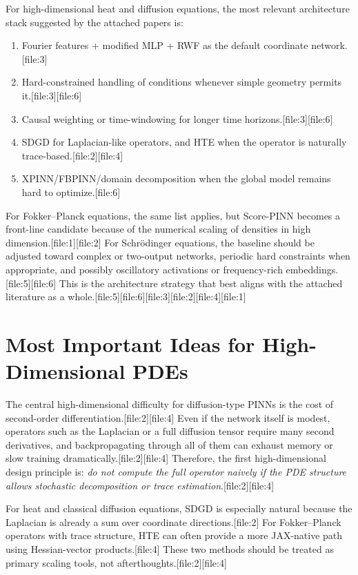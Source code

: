 \documentclass[11pt]{report}
\begin{document}
For high-dimensional heat and diffusion equations, the most relevant architecture stack suggested by the attached papers is:
\begin{enumerate}[label=\arabic*.]
\item Fourier features + modified MLP + RWF as the default coordinate network.[file:3]
\item Hard-constrained handling of conditions whenever simple geometry permits it.[file:3][file:6]
\item Causal weighting or time-windowing for longer time horizons.[file:3][file:6]
\item SDGD for Laplacian-like operators, and HTE when the operator is naturally trace-based.[file:2][file:4]
\item XPINN/FBPINN/domain decomposition when the global model remains hard to optimize.[file:6]
\end{enumerate}

For Fokker--Planck equations, the same list applies, but Score-PINN becomes a front-line candidate because of the numerical scaling of densities in high dimension.[file:1][file:2]  
For Schr\"odinger equations, the baseline should be adjusted toward complex or two-output networks, periodic hard constraints when appropriate, and possibly oscillatory activations or frequency-rich embeddings.[file:5][file:6]  
This is the architecture strategy that best aligns with the attached literature as a whole.[file:5][file:6][file:3][file:2][file:4][file:1]

\chapter{Most Important Ideas for High-Dimensional PDEs}

The central high-dimensional difficulty for diffusion-type PINNs is the cost of second-order differentiation.[file:2][file:4]  
Even if the network itself is modest, operators such as the Laplacian or a full diffusion tensor require many second derivatives, and backpropagating through all of them can exhaust memory or slow training dramatically.[file:2][file:4]  
Therefore, the first high-dimensional design principle is: \emph{do not compute the full operator naively if the PDE structure allows stochastic decomposition or trace estimation}.[file:2][file:4]

For heat and classical diffusion equations, SDGD is especially natural because the Laplacian is already a sum over coordinate directions.[file:2]  
For Fokker--Planck operators with trace structure, HTE can often provide a more JAX-native path using Hessian-vector products.[file:4]  
These two methods should be treated as primary scaling tools, not afterthoughts.[file:2][file:4]
\end{document}
